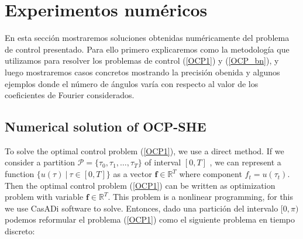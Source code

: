 \section{Experimentos numéricos}

En esta sección mostraremos soluciones obtenidas numéricamente del problema de control presentado. 
%
Para ello primero explicaremos como la metodología que utilizamos para resolver los problemas de control (\ref{OCP1}) y (\ref{OCP_bn}), y luego mostraremos casos concretos mostrando la precisión obenida y algunos ejemplos donde el número de ángulos varía con respecto al valor de los coeficientes de Fourier considerados.

\subsection{Numerical solution of OCP-SHE}

To solve the optimal control problem (\ref{OCP1}), we use a direct method. 
If we consider a partition $\mathcal{P} = \{\tau_0,\tau_1,\dots,\tau_{T}\}$ of interval $[0,T]$ , we can represent a function $\{ u(\tau) \ | \ \tau \in [0,T]\}$ as a vector $\bm{f} \in \mathbb{R}^{T}$ where component $f_t = u(\tau_t)$. Then the optimal control problem (\ref{OCP1}) can be written as optimization problem with variable $\bm{f} \in \mathbb{R}^{T}$. This problem is a nonlinear programming, for this we use CasADi software to solve. Entonces, dado una partición del intervalo $[0,\pi)$ podemos reformular el problema (\ref{OCP1}) como el siguiente problema en tiempo discreto:


